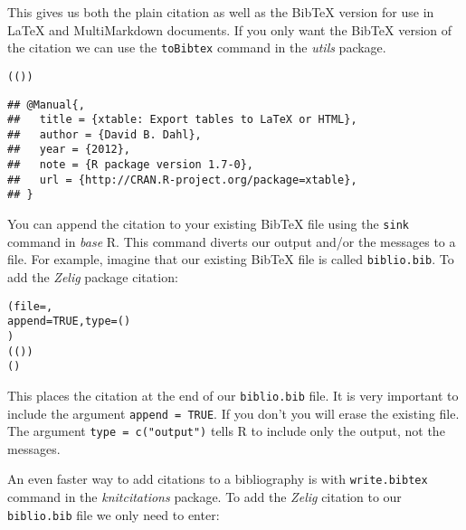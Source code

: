 \noindent This gives us both the plain citation as well as the BibTeX version for use in LaTeX and MultiMarkdown documents. If you only want the BibTeX version of the citation we can use the \texttt{toBibtex} command in the \emph{utils} package.

\begin{knitrout}
\color{fgcolor}\begin{kframe}
\begin{alltt}
(())
\end{alltt}
\begin{verbatim}
## @Manual{,
##   title = {xtable: Export tables to LaTeX or HTML},
##   author = {David B. Dahl},
##   year = {2012},
##   note = {R package version 1.7-0},
##   url = {http://CRAN.R-project.org/package=xtable},
## }
\end{verbatim}
\end{kframe}
\end{knitrout}


\noindent You can append the citation to your existing BibTeX file using the \texttt{sink} command in \emph{base} R. This command diverts our output and/or the messages to a file. For example, imagine that our existing BibTeX file is called \texttt{biblio.bib}. To add the \emph{Zelig} package citation:

\begin{knitrout}
\color{fgcolor}\begin{kframe}
\begin{alltt}
(file = , 
     append = TRUE, type = ()
     )      
(()) 
()
\end{alltt}
\end{kframe}
\end{knitrout}


\noindent This places the citation at the end of our \texttt{biblio.bib} file. It is very important to include the argument \texttt{append = TRUE}. If you don't you will erase the existing file. The argument \texttt{type = c("output")} tells R to include only the output, not the messages.

An even faster way to add citations to a bibliography is with \texttt{write.bibtex} command in the \emph{knitcitations} package. To add the \emph{Zelig} citation to our \texttt{biblio.bib} file we only need to enter:

